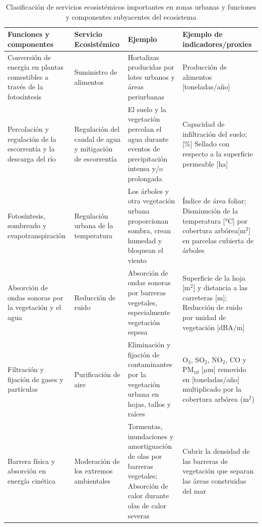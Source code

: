 \documentclass[12pt,a4paper,oneside, openany]{book}
\theoremstyle{definition}
\theoremstyle{definition}
\theoremstyle{definition}
\theoremstyle{remark}
\begin{document}
\begin{landscape}\begin{table}[t]

\caption{\label{tab:clasf-SerAm}Clasificación de servicios ecosistémicos importantes en zonas urbanas y funciones y componentes subyacentes del ecosistema}
\centering
\fontsize{10}{12}\selectfont
\begin{tabular}{>{\raggedright\arraybackslash}p{5cm}>{\raggedright\arraybackslash}p{4.5cm}>{\raggedright\arraybackslash}p{6cm}>{\raggedright\arraybackslash}p{7cm}}
\toprule
Funciones y componentes & Servicio Ecosistémico & Ejemplo & Ejemplo de indicadores/proxies\\
\midrule
Conversión de energía en plantas comestibles a través de la fotosíntesis & Suministro de alimentos & Hortalizas producidas por lotes urbanos y áreas periurbanas & Producción de alimentos [toneladas/año]\\
Percolación y regulación de la escorrentía y la descarga del río & Regulación del caudal de agua y mitigación de escorrentía & El suelo y la vegetación percolan el agua durante eventos de precipitación intensa y/o prolongada & Capacidad de infiltración del suelo; [\%] Sellado con respecto a la superficie permeable [ha]\\
Fotosíntesis, sombreado y evapotranspiración & Regulación urbana de la temperatura & Los árboles y otra vegetación urbana proporcionan sombra, crean humedad y bloquean el viento & Índice de área foliar; Disminución de la temperatura [°C] por cobertura arbórea[m$^2$] en parcelas cubierta de árboles\\
Absorción de ondas sonoras por la vegetación y el agua & Reducción de ruido & Absorción de ondas sonoras por barreras vegetales, especialmente vegetación espesa & Superficie de la hoja [m$^2$] y distancia a las carreteras [m]; Reducción de ruido por unidad de vegetación [dBA/m]\\
Filtración y fijación de gases y partículas & Purificación de aire & Eliminación y fijación de contaminantes por la vegetación urbana en hojas, tallos y raíces & O$_3$, SO$_2$, NO$_2$, CO y PM$_{10}$ [$\mu$m] removido en [toneladas/año] multiplicado por la cobertura arbórea (m$^2$)\\
\addlinespace
Barrera física y absorción en energía cinética & Moderación de los extremos ambientales & Tormentas, inundaciones y amortiguación de olas por barreras vegetales; Absorción de calor durante olas de calor severas & Cubrir la densidad de las barreras de vegetación que separan las áreas construidas del mar\\

\end{tabular}
\end{table}
\end{landscape}
\end{document}
